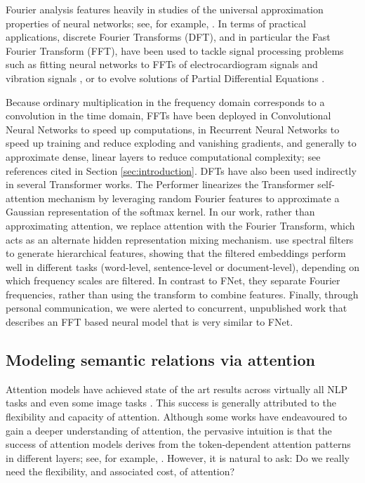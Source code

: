 \documentclass[11pt]{article}
\begin{document}
Fourier analysis features heavily in studies of the universal approximation properties of neural networks; see, for example, \citep{cybenko1989approximation, barron1993universal}. In terms of practical applications, discrete Fourier Transforms (DFT), and in particular the Fast Fourier Transform (FFT), have been used to tackle signal processing problems such as fitting neural networks to FFTs of electrocardiogram signals \citep{minami1999real, gothwal2011cardiac, mironovova2015fast} and vibration signals \citep{zhang2013fault}, or to evolve solutions of Partial Differential Equations \citep{li2020fourier}.

Because ordinary multiplication in the frequency domain corresponds to a convolution in the time domain, FFTs have been deployed in Convolutional Neural Networks to speed up computations, in Recurrent Neural Networks to speed up training and reduce exploding and vanishing gradients, and generally to approximate dense, linear layers to reduce computational complexity; see references cited in Section \ref{sec:introduction}. DFTs have also been used indirectly in several Transformer works. The Performer \citep{choromanski2020masked} linearizes the Transformer self-attention mechanism by leveraging random Fourier features to approximate a Gaussian representation of the softmax kernel. In our work, rather than approximating attention, we replace attention with the Fourier Transform, which acts as an alternate hidden representation mixing mechanism.  \citet{tamkin2020language} use spectral filters to generate hierarchical features, showing that the filtered embeddings perform well in different tasks (word-level, sentence-level or document-level), depending on which frequency scales are filtered. In contrast to FNet, they separate Fourier frequencies, rather than using the transform to combine features.
Finally, through personal communication, we were alerted to concurrent, unpublished work \citep{backurs2021note} that describes an FFT based neural model that is very similar to FNet.


\subsection{Modeling semantic relations via attention}
\label{subsec:power_of_attention}

Attention models have achieved state of the art results across virtually all NLP tasks and even some image tasks \citep{dosovitskiy2020image}.
This success is generally attributed to the flexibility and capacity of attention. Although some works \citep{ramsauer2020hopfield} have endeavoured to gain a deeper understanding of attention, the pervasive intuition is that the success of attention models derives from the token-dependent attention patterns in different layers; see, for example, \citep{tenney-etal-2019-bert}. However, it is natural to ask: Do we really need the flexibility, and associated cost, of attention? 
\end{document}
